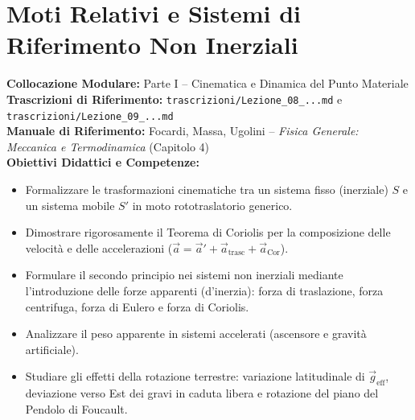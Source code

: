 \chapter{Moti Relativi e Sistemi di Riferimento Non Inerziali}
\label{chap:sistemi_non_inerziali}

\begin{tcolorbox}[enhanced, breakable, colback=navyblue!4!white, colframe=navyblue!80!black,
    coltitle=white, fonttitle=\bfseries\sffamily, title={Quadro Sinottico del Capitolo 04 (Corrispondenza: Lezioni 08 e 09)},
    sharp corners, rounded corners=south, boxrule=1pt]
\textbf{Collocazione Modulare:} Parte I -- Cinematica e Dinamica del Punto Materiale\\
\textbf{Trascrizioni di Riferimento:} \texttt{trascrizioni/Lezione\_08\_...md} e \texttt{trascrizioni/Lezione\_09\_...md}\\
\textbf{Manuale di Riferimento:} Focardi, Massa, Ugolini -- \emph{Fisica Generale: Meccanica e Termodinamica} (Capitolo 4)\\
\textbf{Obiettivi Didattici e Competenze:}\par
\begin{itemize}
    \item Formalizzare le trasformazioni cinematiche tra un sistema fisso (inerziale) $S$ e un sistema mobile $S'$ in moto rototraslatorio generico.
    \item Dimostrare rigorosamente il Teorema di Coriolis per la composizione delle velocità e delle accelerazioni ($\vec{a} = \vec{a}' + \vec{a}_{\text{trasc}} + \vec{a}_{\text{Cor}}$).
    \item Formulare il secondo principio nei sistemi non inerziali mediante l'introduzione delle forze apparenti (d'inerzia): forza di traslazione, forza centrifuga, forza di Eulero e forza di Coriolis.
    \item Analizzare il peso apparente in sistemi accelerati (ascensore e gravità artificiale).
    \item Studiare gli effetti della rotazione terrestre: variazione latitudinale di $\vec{g}_{\text{eff}}$, deviazione verso Est dei gravi in caduta libera e rotazione del piano del Pendolo di Foucault.
\end{itemize}
\end{tcolorbox}

